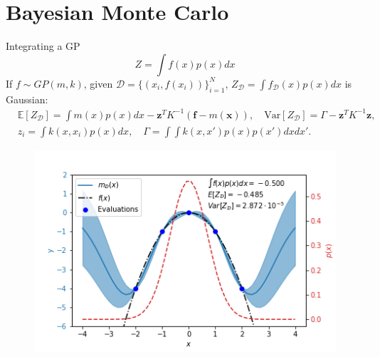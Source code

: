 \documentclass{beamer}
\def \Ev {{\mathbb E}}
\newcommand{\Var}{\mathrm{Var}}
\begin{document}
\section{Bayesian Monte Carlo}
\begin{frame}{}
\begin{block}{Integrating a GP}
\begin{equation*}
Z = \int f(x) p(x) dx
\end{equation*}
If $f \sim GP(m,k)$, given $\mathcal{D} = \{(x_i,f(x_i))\}_{i=1}^N$, $Z_\mathcal{D} = \int f_\mathcal{D}(x) p(x) dx$ is Gaussian:
\begin{equation*}
\begin{split}
& \Ev[Z_{\mathcal{D}}] = \int m(x) p(x) dx - \mathbf{z}^T K^{-1} (\mathbf{f}-m(\mathbf{x})), \quad
\Var[Z_{\mathcal{D}}] = \Gamma - \mathbf{z}^T K^{-1} \mathbf{z}, \\
& z_i = \int k(x,x_i) p(x) dx, \quad \Gamma = \int \int k(x,x') p(x) p(x') dx dx'.
\end{split}
\end{equation*}
\begin{block}{}

\end{block}
\end{block}
\end{frame}
\begin{frame}{}
\begin{figure}
\centering
\includegraphics[width=0.8\linewidth]{figs/exbmc.png}
\end{figure}
\end{frame}
\end{document}
